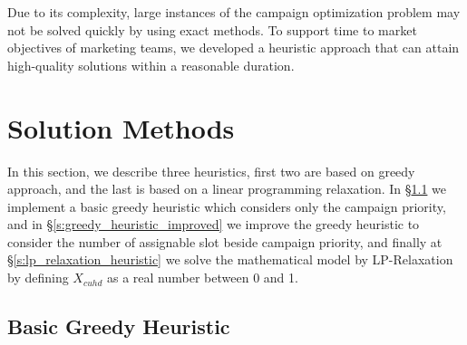 \documentclass[11pt]{article}
\begin{document}
Due to its complexity, large instances of the campaign optimization problem may not be solved quickly by using exact methods. To support time to market objectives of marketing teams, we developed a heuristic approach that can attain high-quality solutions within a reasonable duration.


\section{Solution Methods}  \label{s:solution-method}

In this section, we describe three heuristics, first two are based on greedy approach, and the last is based on a linear programming relaxation. In \S \ref{s:greedy_heuristic_basic} we implement a basic greedy heuristic which considers only the campaign priority, and in \S \ref{s:greedy_heuristic_improved} we improve the greedy heuristic to consider the number of assignable slot beside campaign priority, and finally at \S \ref{s:lp_relaxation_heuristic} we solve the mathematical model by LP-Relaxation by defining $X_{{c}{u}{h}{d}}$ as a real number between 0 and 1.

\subsection{Basic Greedy Heuristic} \label{s:greedy_heuristic_basic}
\end{document}
